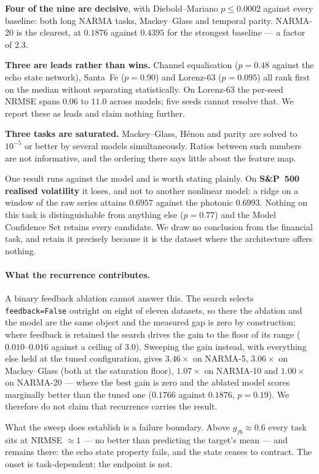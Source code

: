 \documentclass[11pt]{article}
\begin{document}
\textbf{Four of the nine are decisive}, with Diebold--Mariano $p \leq 0.0002$ against every
baseline: both long NARMA tasks, Mackey--Glass and temporal parity. NARMA-20 is the clearest,
at $0.1876$ against $0.4395$ for the strongest baseline --- a factor of $2.3$.

\textbf{Three are leads rather than wins.} Channel equalisation ($p = 0.48$ against the echo
state network), Santa~Fe ($p = 0.90$) and Lorenz-63 ($p = 0.095$) all rank first on the median
without separating statistically. On Lorenz-63 the per-seed NRMSE spans $0.06$ to $11.0$ across
models; five seeds cannot resolve that. We report these as leads and claim nothing further.

\textbf{Three tasks are saturated.} Mackey--Glass, Hénon and parity are solved to $10^{-5}$ or
better by several models simultaneously. Ratios between such numbers are not informative, and
the ordering there says little about the feature map.

One result runs against the model and is worth stating plainly. On \textbf{S\&P~500 realised
volatility} it loses, and not to another nonlinear model: a ridge on a window of the raw series
attains $0.6957$ against the photonic $0.6993$. Nothing on this task is distinguishable from
anything else ($p = 0.77$) and the Model Confidence Set retains every candidate. We draw no
conclusion from the financial task, and retain it precisely because it is the dataset where the
architecture offers nothing.

\paragraph{What the recurrence contributes.} A binary feedback ablation cannot answer this.
The search selects \texttt{feedback=False} outright on eight of eleven datasets, so there the
ablation and the model are the same object and the measured gap is zero by construction; where
feedback is retained the search drives the gain to the floor of its range ($0.010$--$0.016$
against a ceiling of $3.0$). Sweeping the gain instead, with everything else held at the tuned
configuration, gives $3.46\times$ on NARMA-5, $3.06\times$ on Mackey--Glass (both at the
saturation floor), $1.07\times$ on NARMA-10 and $1.00\times$ on NARMA-20 --- where the best
gain is zero and the ablated model scores marginally better than the tuned one ($0.1766$ against
$0.1876$, $p = 0.19$). We therefore do not claim that recurrence carries the result.

What the sweep does establish is a failure boundary. Above $g_{fb} \approx 0.6$ every task sits
at NRMSE $\approx 1$ --- no better than predicting the target's mean --- and remains there: the
echo state property fails, and the state ceases to contract. The onset is task-dependent; the
endpoint is not.
\end{document}
